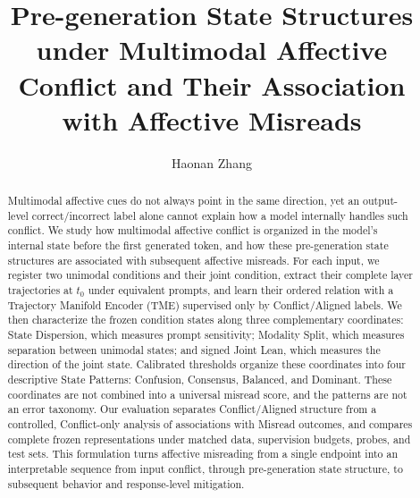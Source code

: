 \documentclass[10pt,journal]{IEEEtran}
\title{Pre-generation State Structures under Multimodal Affective Conflict and Their Association with Affective Misreads}
\author{Haonan Zhang}
\begin{document}
\maketitle

\begin{abstract}
Multimodal affective cues do not always point in the same direction, yet an
output-level correct/incorrect label alone cannot explain how a model internally
handles such conflict. We study how multimodal affective conflict is organized in
the model's internal state before the first generated token, and how these
pre-generation state structures are associated with subsequent affective misreads.
For each input, we register two unimodal conditions and their joint condition,
extract their complete layer trajectories at \(t_0\) under equivalent prompts, and
learn their ordered relation with a Trajectory Manifold Encoder (TME) supervised
only by Conflict/Aligned labels. We then characterize the frozen condition states
along three complementary coordinates: State Dispersion, which measures prompt
sensitivity; Modality Split, which measures separation between unimodal states; and
signed Joint Lean, which measures the direction of the joint state. Calibrated
thresholds organize these coordinates into four descriptive State Patterns:
Confusion, Consensus, Balanced, and Dominant. These coordinates are not combined
into a universal misread score, and the patterns are not an error taxonomy. Our
evaluation separates Conflict/Aligned structure from a controlled, Conflict-only
analysis of associations with Misread outcomes, and compares complete frozen
representations under matched data, supervision budgets, probes, and test sets. This
formulation turns affective misreading from a single endpoint into an interpretable
sequence from input conflict, through pre-generation state structure, to subsequent
behavior and response-level mitigation.
\end{abstract}









\end{document}
